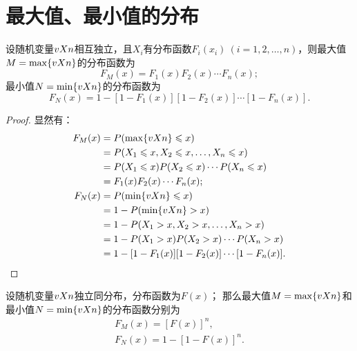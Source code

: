 \section{最大值、最小值的分布}
\begin{theorem}
设随机变量\(v{X}{n}\)相互独立，且\(X_i\)有分布函数\(F_i(x_i)\ (i=1,2,\dotsc,n)\)，则最大值\(M=\max\{v{X}{n}\}\)的分布函数为
\begin{equation}
F_M(x) = F_1(x) F_2(x) \dotsm F_n(x);
\end{equation}
最小值\(N=\min\{v{X}{n}\}\)的分布函数为
\begin{equation}
F_N(x) = 1 - [1-F_1(x)][1-F_2(x)]\dotsm[1-F_n(x)].
\end{equation}
\begin{proof}
显然有：
\begin{align*}
F_M(x) &= P(\max\{v{X}{n}\} \leqslant x) \\
&= P(X_1 \leqslant x,X_2 \leqslant x,\dotsc,X_n \leqslant x) \\
&= P(X_1 \leqslant x) P(X_2 \leqslant x) \dotsm P(X_n \leqslant x) \\
&= F_1(x) F_2(x) \dotsm F_n(x); \\
F_N(x) &= P(\min\{v{X}{n}\} \leqslant x) \\
&= 1 - P(\min\{v{X}{n}\} > x) \\
&= 1 - P(X_1 > x,X_2 > x,\dotsc,X_n > x) \\
&= 1 - P(X_1 > x) P(X_2 > x) \dotsm P(X_n > x) \\
&= 1 - [1-F_1(x)][1-F_2(x)]\dotsm[1-F_n(x)].
\qedhere
\end{align*}
\end{proof}
\end{theorem}

\begin{corollary}
设随机变量\(v{X}{n}\)独立同分布，分布函数为\(F(x)\)；%
那么最大值\(M=\max\{v{X}{n}\}\)和最小值\(N=\min\{v{X}{n}\}\)的分布函数分别为\begin{gather}
F_M(x) = [F(x)]^n, \\
F_N(x) = 1-[1-F(x)]^n.
\end{gather}
\end{corollary}


